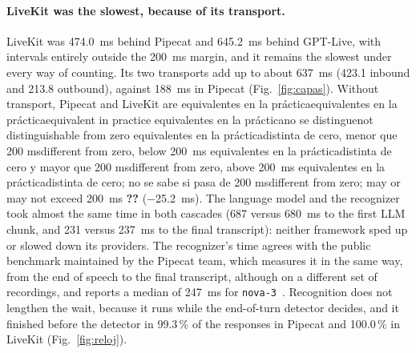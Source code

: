 \documentclass[11pt]{article}
\makeatletter
\newcommand{\RDifAbsDosTres}{645.2}
\newcommand{\RDifAbsUnoDos}{474.0}
\newcommand{\RDifCorrUnoDos}{$-$25.2}
\newcommand{\RDifCorrVeredictoUnoDos}{equivalentes en la práctica}
\newcommand{\REtapaLlmA}{687}
\newcommand{\REtapaLlmB}{680}
\newcommand{\REtapaSttA}{231}
\newcommand{\REtapaSttB}{237}
\newcommand{\RIdaB}{423.1}
\newcommand{\RTramoSttAntesPctA}{99.3}
\newcommand{\RTramoSttAntesPctB}{100.0}
\newcommand{\RTransporteA}{188}
\newcommand{\RTransporteB}{637}
\newcommand{\RVueltaB}{213.8}
\newcommand{\ver@eq}{equivalentes en la práctica}
\newcommand{\ver@nd}{no se distingue}
\newcommand{\ver@menor}{distinta de cero, menor que 200 ms}
\newcommand{\ver@mayor}{distinta de cero y mayor que 200 ms}
\newcommand{\ver@cruza}{distinta de cero; no se sabe si pasa de 200 ms}
\newcommand{\verdict}[1]{%
  \ifx#1\ver@eq equivalent in practice%
  \else\ifx#1\ver@nd not distinguishable from zero%
  \else\ifx#1\ver@menor different from zero, below 200~ms%
  \else\ifx#1\ver@mayor different from zero, above 200~ms%
  \else\ifx#1\ver@cruza different from zero; may or may not exceed 200~ms%
  \else\textbf{??}\PackageWarning{paper}{Unknown verdict}%
  \fi\fi\fi\fi\fi}
\makeatother
\begin{document}
\paragraph{LiveKit was the slowest, because of its transport.} LiveKit was
\RDifAbsUnoDos~ms behind Pipecat and \RDifAbsDosTres~ms behind GPT-Live, with intervals
entirely outside the 200~ms margin, and it remains the slowest under every way of
counting. Its two transports add up to about \RTransporteB~ms (\RIdaB{} inbound and
\RVueltaB{} outbound), against \RTransporteA~ms in Pipecat (Fig.~\ref{fig:capas}).
Without transport, Pipecat and LiveKit are \verdict{\RDifCorrVeredictoUnoDos}
(\RDifCorrUnoDos~ms). The language model and the recognizer took almost the same time
in both cascades (\REtapaLlmA{} versus \REtapaLlmB~ms to the first LLM chunk, and
\REtapaSttA{} versus \REtapaSttB~ms to the final transcript): neither framework sped
up or slowed down its providers.
The recognizer's time agrees with the public benchmark maintained by the Pipecat team, which measures it in the same way, from the end of speech to the final transcript, although on a different set of recordings, and reports a median of 247~ms for \texttt{nova-3}~\cite{sttbenchmark}.
Recognition does not lengthen the wait, because it runs while the end-of-turn detector decides, and it finished before the detector in \RTramoSttAntesPctA\,\% of the responses in Pipecat and \RTramoSttAntesPctB\,\% in LiveKit (Fig.~\ref{fig:reloj}).
\end{document}
